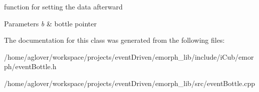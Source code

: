 function for setting the data afterward 


\begin{DoxyParams}{Parameters}
{\em b} & bottle pointer \\
\hline
\end{DoxyParams}


The documentation for this class was generated from the following files\-:\begin{DoxyCompactItemize}
\item 
/home/aglover/workspace/projects/event\-Driven/emorph\-\_\-lib/include/i\-Cub/emorph/event\-Bottle.\-h\item 
/home/aglover/workspace/projects/event\-Driven/emorph\-\_\-lib/src/event\-Bottle.\-cpp\end{DoxyCompactItemize}
